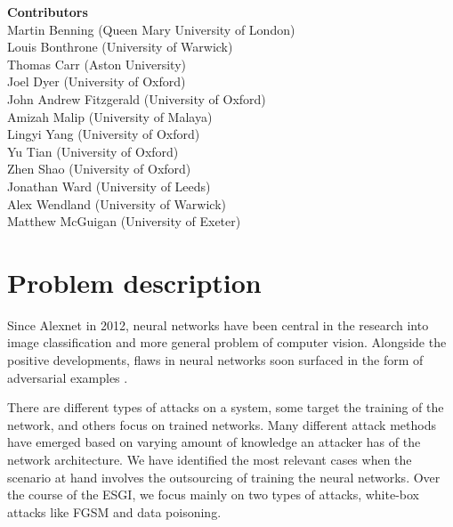 \documentclass[12pt]{article}
\begin{document}
\begin{center}
    \large\textbf{Contributors}\\
    \vskip1cm
    \normalsize Martin Benning (Queen Mary University of London)\\
    \normalsize Louis Bonthrone (University of Warwick)\\
    \normalsize Thomas Carr (Aston University)\\
    \normalsize Joel Dyer (University of Oxford)\\
    \normalsize John Andrew Fitzgerald (University of Oxford)\\
    \normalsize Amizah Malip (University of Malaya)\\
    \normalsize Lingyi Yang (University of Oxford)\\
    \normalsize Yu Tian (University of Oxford)\\
    \normalsize Zhen Shao (University of Oxford)\\
    \normalsize Jonathan Ward (University of Leeds)\\
    \normalsize Alex Wendland (University of Warwick)\\
    \normalsize Matthew McGuigan (University of Exeter)
\end{center}
\newpage

\tableofcontents
\newpage




\section{Problem description}
Since Alexnet in 2012, neural networks have been central in the research into image classification and more general problem of computer vision. Alongside the positive developments, flaws in neural networks soon surfaced in the form of adversarial examples \cite{Szegedy13}.

There are different types of attacks on a system, some target the training of the network, and others focus on trained networks. Many different attack methods have emerged based on varying amount of knowledge an attacker has of the network architecture. We have identified the most relevant cases when the scenario at hand involves the outsourcing of training the neural networks. Over the course of the ESGI, we focus mainly on two types of attacks, white-box attacks like FGSM and data poisoning.
\end{document}

